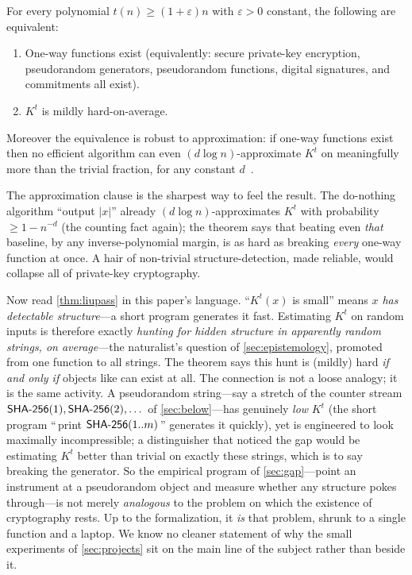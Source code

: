\begin{theorem}\label{thm:liupass}
For every polynomial $t(n) \ge (1+\varepsilon)n$ with $\varepsilon>0$
constant, the following are equivalent:
\begin{enumerate}
  \item One-way functions exist (equivalently: secure private-key
  encryption, pseudorandom generators, pseudorandom functions, digital
  signatures, and commitments all exist).
  \item $K^{t}$ is mildly hard-on-average.
\end{enumerate}
Moreover the equivalence is robust to approximation: if one-way
functions exist then no efficient algorithm can even
$(d\log n)$-approximate $K^{t}$ on meaningfully more than the trivial
fraction, for any constant $d$~\citep{LiuPass2020}.
\end{theorem}

The approximation clause is the sharpest way to feel the result. The
do-nothing algorithm ``output $|x|$'' already $(d\log n)$-approximates
$K^{t}$ with probability $\ge 1 - n^{-d}$ (the counting fact again); the
theorem says that beating even \emph{that} baseline, by any
inverse-polynomial margin, is as hard as breaking \emph{every} one-way
function at once. A hair of non-trivial structure-detection, made
reliable, would collapse all of private-key cryptography.

Now read \cref{thm:liupass} in this paper's language. ``$K^{t}(x)$ is
small'' means \emph{$x$ has detectable structure}---a short program
generates it fast. Estimating $K^{t}$ on random inputs is therefore
exactly \emph{hunting for hidden structure in apparently random
strings, on average}---the naturalist's question of \cref{sec:epistemology},
promoted from one function to all strings. The theorem says this hunt is
(mildly) hard \emph{if and only if} objects like \SHA{} can exist at
all. The connection is not a loose analogy; it is the same activity. A
pseudorandom string---say a stretch of the counter stream $\textsf{SHA-256}(1),
\textsf{SHA-256}(2), \dots$ of \cref{sec:below}---has genuinely \emph{low} $K^{t}$
(the short program ``\,print $\textsf{SHA-256}(1..m)$\,'' generates it quickly), yet
is engineered to look maximally incompressible; a distinguisher that
noticed the gap would be estimating $K^{t}$ better than trivial on
exactly these strings, which is to say breaking the generator. So the
empirical program of \cref{sec:gap}---point an instrument at a
pseudorandom object and measure whether any structure pokes through---is
not merely \emph{analogous} to the problem on which the existence of
cryptography rests. Up to the formalization, it \emph{is} that problem,
shrunk to a single function and a laptop. We know no cleaner statement
of why the small experiments of \cref{sec:projects} sit on the main line
of the subject rather than beside it.

